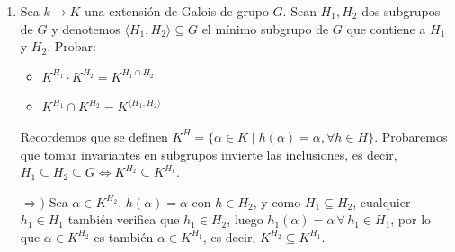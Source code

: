 \begin{enumerate}
    \item Sea $k \rightarrow K$ una extensión de Galois de grupo $G$. Sean $H_{1}, H_{2}$ dos subgrupos de $G$ y denotemos $\langle H_{1}, H_{2} \rangle \subseteq G$ el mínimo subgrupo de $G$ que contiene a $H_{1}$ y $H_{2}$. Probar:
    \begin{itemize}
        \item[a)] $K^{H_{1}} \cdot K^{H_{2}} = K^{H_{1} \cap H_{2}}$
        \item[b)] $K^{H_{1}} \cap K^{H_{2}} = K^{\langle H_{1}, H_{2} \rangle}$
    \end{itemize}
    \begin{dem}
        Recordemos que se definen $K^H = \{ \alpha \in K \mid h(\alpha) = \alpha, \forall h \in H \}$. Probaremos que tomar invariantes en subgrupos invierte las inclusiones, es decir, $H_1\subseteq H_2 \subseteq G \iff K^{H_2} \subseteq K^{H_1}$.
        
        $\Rightarrow)$ Sea $\alpha \in K^{H_2}$, $h(\alpha)=\alpha$ con $h\in H_2$, y como $H_1 \subseteq H_2$, cualquier $h_1 \in H_1$ tambi\'en verifica que $h_1 \in H_2$, luego $h_1 (\alpha) = \alpha \, \forall \, h_1 \in H_1$, por lo que $\alpha \in K^{H_2}$ es tambi\'en $\alpha \in K^{H_1}$, es decir, $K^{H_2} \subseteq K^{H_1}$. 


\end{dem}
\end{enumerate}
